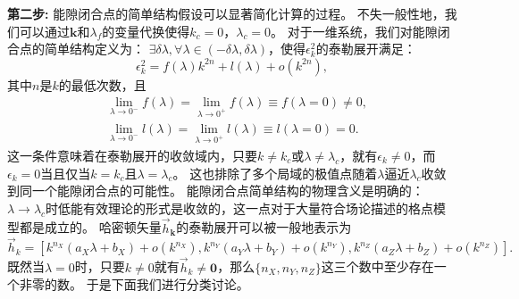 			{\bf 第二步:}
			能隙闭合点的简单结构假设可以显著简化计算的过程。
			不失一般性地，我们可以通过$\mathbf{k}$和$\lambda_f$的变量代换使得$k_c=0$，$\lambda_c=0$。
			对于一维系统，我们对能隙闭合点的简单结构定义为：
			$\exists \delta \lambda, \forall \lambda \in (- \delta \lambda, \delta \lambda)$，使得$\epsilon_k^2$的泰勒展开满足：
			\begin{equation}
				\epsilon_k^2 = f(\lambda) k^{2n} + l(\lambda) + o(k^{2n}),
			\end{equation}
			其中$n$是$k$的最低次数，且
			\begin{equation}
				\begin{aligned}
					& \lim_{\lambda \rightarrow 0^-}{f(\lambda)} = \lim_{\lambda \rightarrow 0^+}{f(\lambda)} \equiv f(\lambda=0)\neq0,\\
					& \lim_{\lambda \rightarrow 0^-}{l(\lambda)} = \lim_{\lambda \rightarrow 0^+}{l(\lambda)} \equiv l(\lambda=0)=0.
				\end{aligned}
			\end{equation}
			这一条件意味着在泰勒展开的收敛域内，只要$k \neq k_c$或$\lambda \neq \lambda_c$，就有$\epsilon_k \neq 0$，而$\epsilon_k = 0$当且仅当$k=k_c$且$\lambda=\lambda_c$。
			这也排除了多个局域的极值点随着$\lambda$逼近$\lambda_c$收敛到同一个能隙闭合点的可能性。
			能隙闭合点简单结构的物理含义是明确的：$\lambda\rightarrow\lambda_c$时低能有效理论的形式是收敛的，这一点对于大量符合场论描述的格点模型都是成立的。
			哈密顿矢量${\vec{h}}_{\mathbf{k}}$的泰勒展开可以被一般地表示为
			\begin{equation}
				\vec{h}_k = [k^{n_X}(a_X \lambda + b_X) + o(k^{n_X}),
				k^{n_Y}(a_Y \lambda + b_Y) + o(k^{n_Y}),
				k^{n_Z}(a_Z \lambda + b_Z) + o(k^{n_Z})].
			\end{equation}
			既然当$\lambda=0$时，只要$k \neq 0$就有$\vec{h}_k \neq \mathbf{0}$，那么$\{n_X,n_Y,n_Z\}$这三个数中至少存在一个非零的数。
			于是下面我们进行分类讨论。
